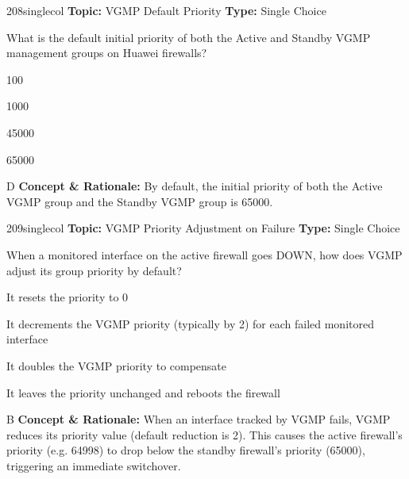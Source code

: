 \begin{qcard}{208}{singlecol}
\textcolor{darkslate!75}{\small\textbf{Topic:} VGMP Default Priority \hfill \textbf{Type:} Single Choice}\vspace{0.4em}\par
What is the default initial priority of both the Active and Standby VGMP management groups on Huawei firewalls?
\begin{qoptions}
\item 100
\item 1000
\item 45000
\item 65000
\end{qoptions}
\end{qcard}
\nopagebreak
\begin{explainbox}{D}
\textbf{Concept \& Rationale:} By default, the initial priority of both the Active VGMP group and the Standby VGMP group is 65000.
\end{explainbox}

\begin{qcard}{209}{singlecol}
\textcolor{darkslate!75}{\small\textbf{Topic:} VGMP Priority Adjustment on Failure \hfill \textbf{Type:} Single Choice}\vspace{0.4em}\par
When a monitored interface on the active firewall goes DOWN, how does VGMP adjust its group priority by default?
\begin{qoptions}
\item It resets the priority to 0
\item It decrements the VGMP priority (typically by 2) for each failed monitored interface
\item It doubles the VGMP priority to compensate
\item It leaves the priority unchanged and reboots the firewall
\end{qoptions}
\end{qcard}
\nopagebreak
\begin{explainbox}{B}
\textbf{Concept \& Rationale:} When an interface tracked by VGMP fails, VGMP reduces its priority value (default reduction is 2). This causes the active firewall's priority (e.g. 64998) to drop below the standby firewall's priority (65000), triggering an immediate switchover.
\end{explainbox}

